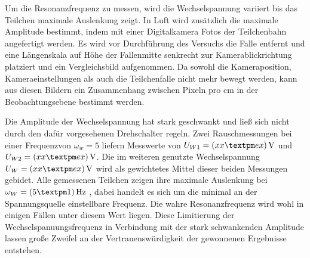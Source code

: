 \documentclass[a4paper,12pt]{article}
\begin{document}
Um die Resonanzfrequenz zu messen, wird die Wechselspannung variiert bis das Teilchen maximale Auslenkung zeigt.
In Luft wird zusätzlich die maximale Amplitude bestimmt, indem mit einer Digitalkamera Fotos der Teilchenbahn angefertigt werden.
Es wird vor Durchführung des Versuchs die Falle entfernt und eine Längenskala auf Höhe der Fallenmitte senkrecht zur Kamerablickrichtung platziert und ein Vergleichsbild aufgenommen.
Da sowohl die Kameraposition, Kameraeinstellungen als auch die Teilchenfalle nicht mehr bewegt werden,
kann aus diesen Bildern ein Zusammenhang zwischen Pixeln pro cm in der Beobachtungsebene bestimmt werden.

Die Amplitude der Wechselspannung hat stark geschwankt und ließ sich nicht durch den dafür vorgesehenen Drehschalter regeln.
 Zwei Rauschmessungen bei einer Frequenzvon $\omega_w = 5$ liefern Messwerte
 von $U_{W1} = \unit[(xx±ex)]{V}$ und $U_{W2} = \unit[(xx±ex)]{V}$. 
 Die im weiteren genutzte Wechselspannung $U_W = \unit[(xx±ex)]{V}$ wird als gewichtetes Mittel dieser beiden Messungen gebidet.
 Alle gemessenen Teilchen zeigen ihre maximale Auslenkung bei $\omega_W = \unit[(5±1)]{Hz}$ , dabei handelt es sich um
 die minimal an der Spannungsquelle einstellbare Frequenz. Die wahre Resonanzfrequenz wird wohl in einigen Fällen unter
 diesem Wert liegen. Diese Limitierung der Wechselspanuungsfrequenz in Verbindung mit der stark schwankenden Amplitude 
 lassen große Zweifel an der Vertrauenswürdigkeit der gewonnenen Ergebnisse entstehen. 


\end{document}
